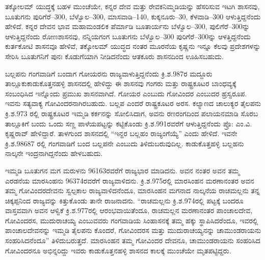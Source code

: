 ತಕ್ಕೋಲಮ್ ಯುದ್ಧಕ್ಕೆ ಬಹಳ ಮುಂಚೆಯೇ, ಕನ್ನರ ದೇವ ಮತ್ತು ರೇವಕನಿಮ್ಮಡಿಯನ್ನು ಹೆಸರಿಸುವ ಇಟಗಿ ಶಾಸನವು, ಬೂತುಗನು ಪುರಿಗೆರೆ–300, ಬೆಳ್ವೊಲ–300, ಮಾಸವಾಡಿ–140, ಕುಕ್ಕನೂರು–30, ಕೆಳವಾಡಿ–300 ಆಳುತ್ತಿದ್ದನೆಂದು ಹೇಳಿದೆ. ಕನ್ನರ ದೇವನ ಭಾವ ಮಹಾಮಂಡಲಿಕ ಪೆರ್ಮಾಡಿ ಬೂತಾರ್ಯನು ಬೆಳ್ವೊಲ–300, ಪುಲಿಗೆರೆ–300ನ್ನು ಆಳುತ್ತಿದ್ದನೆಂದು ರೋಣಶಾಸನವು, ನನ್ನಿಯಗಂಗ ಬೂತುಗನು ಬೆಳ್ವೊಲ–300 ಪುರಿಗೆರೆ–300ನ್ನು ಆಳತ್ತಿದ್ದನೆಂದು ಕುರ್ತಕೋಟಿ ಶಾಸನವೂ ಹೇಳಿವೆ, ತಕ್ಕೋಲಮ್ ಯುದ್ಧದ ನಂತರ ಮೂರನೆಯ ಕೃಷ್ಣನು ಇನ್ನೂ ಕೆಲವು ಪ್ರದೇಶಗಳನ್ನು ಸೇರಿಸಿ ಬೂತುಗನಿಗೆ ಪುನಃ ಕೊಡುಗೆಯಾಗಿ ನೀಡಿದನೆಂದು ಆತಕೂರು ಶಾಸನದಿಂದ ಊಹಿಸಬಹುದು.

ಬಲ್ಲಪನು ಗಂಗವಾಡಿಗೆ ಬಂದಾಗ ಗೋಯರನು ರಾಜ್ಯವಾಳುತ್ತಿದ್ದನೆಂದು ಕ್ರಿ.ಶ.987ರ ಮದ್ದೂರು ತಾಲ್ಲೂಕು\break ಕಾಡುಕೊತ್ತನಹಳ್ಳಿ ಶಾಸನದಲ್ಲಿ ಹೇಳಿದ್ದು ಈ ಶಾಸನವು ಗಂಗರು ಮತ್ತು ರಾಷ್ಟ್ರಕೂಟರ ಬಾಂಧವ್ಯಕ್ಕೆ ಸಂಬಂಧಿಸಿದ ಇನ್ನೊಂದು ಪ್ರಮುಖ ಶಾಸನವಾಗಿದೆ. ಗೋಯರ ಎಂಬುದು ಗೋವಿಂದರ ಎಂಬುದರ ಹ್ರಸ್ವರೂಪ. ಇವನು ಸತ್ಯವಾಕ್ಯ ಗೋವಿಂದರನಾಗಿರಬಹುದು. ಬಲ್ಲಪ ಎಂದರೆ ರಾಷ್ಟ್ರಕೂಟರ ಅರಸ. ಕಲ್ಯಾಣದ ಚಾಲುಕ್ಯರ ತೈಲಪನು ಕ್ರಿ.ಶ.973 ರಲ್ಲಿ ರಾಷ್ಟ್ರಕೂಟರ ಇಮ್ಮಡಿ ಕರ್ಕನನ್ನು ಸೋಲಿಸಿದಾಗ, ಅವನು ರಣರಂಗದಿಂದ ಪಲಾಯನಮಾಡಿ ಸೊರಬ ತಾಲ್ಲೂಕಿಗೆ ಬಂದು ಒಂದು ಸಣ್ಣ ಪಾಳೆಯಪಟ್ಟನ್ನು ಕಟ್ಟಿಕೊಂಡು ಕ್ರಿ.ಶ.991ರವರೆಗೆ ಆಳುತ್ತಿದ್ದನೆಂದು ಪ್ರೊ: ಎಂ.ವಿ. ಕೃಷ್ಣರಾವ್​ ಹೇಳಿದ್ದಾರೆ. ತಾಳಗುಂದ ಶಾಸನದಲ್ಲಿ “ಇನ್ದರ ಬಲ್ಲಹಂ ರಾಜ್ಯಂಗೆಯ್ಯೆ” ಎಂದು ಹೇಳಿದೆ. ಇವನೇ ಕ್ರಿ.ಶ.98687 ರಲ್ಲಿ ಗಂಗವಾಡಿಗೆ ಬಂದ ಬಲ್ಲಪನೇ ಎಂಬುದು ತಿಳಿದುಬರುವುದಿಲ್ಲ. ಕಾಡುಕೊತ್ತಹಳ್ಳಿ ಬಲ್ಲಹನು ನಾಲ್ಕನೇ ಇಂದ್ರನಾಗಿದ್ದನೆಂದು ಹೇಳಬಹುದು. 

ಇಮ್ಮಡಿ ಬೂತುಗನ ಮಗ ಮರುಳನು 96163ರವರೆಗೆ ರಾಜ್ಯಭಾರ ಮಾಡಿದನು. ಅವನ ನಂತರ ಅವನ ತಮ್ಮ ಎರಡನೆಯ ಮಾರಸಿಂಹನು 96374ರವರೆಗೆ ರಾಜ್ಯವಾಳಿದನು. ಕ್ರಿ.ಶ.975ರಲ್ಲಿ ಮಾರಸಿಂಹನ ಮರಣಾನಂತರ ಅವನ ತಮ್ಮ ಗೋವಿಂದರದೇವನು ಸ್ವಲ್ಪಕಾಲ ರಾಜ್ಯವಾಳಿದನೆಂದೂ, ಮಾರಸಿಂಹನ ಮಗನಾದ ನಾಲ್ಕನೆಯ ರಾಚಮಲ್ಲನು ತನ್ನ ಚಿಕ್ಕಪ್ಪನಿಂದ ರಾಜ್ಯವನ್ನು ಕಿತ್ತುಕೊಂಡು ತಾನೇ ರಾಜನಾದನು. “ರಾಚಮಲ್ಲನು ಕ್ರಿ.ಶ.974ರಲ್ಲಿ ಪಟ್ಟಕ್ಕೆ ಬಂದರೂ ವಾಸ್ತವವಾಗಿ ಅವನ ಆಳ್ವಿಕೆ ಕ್ರಿ.ಶ.977ರಲ್ಲಿ ಆರಂಭವಾಯಿತೆಂದೂ, ರಾಚಮಲ್ಲನ ಮರಣಾನಂತರ ಪಾಂಚಾಲದೇವ, ಗೋವಿಂದರಸ, ಮುದುರಾಚಯ್ಯ ಎಂಬುವವರು ಗಂಗವಾಡಿಯ ಸಿಂಹಾಸನಕ್ಕೆ ತಮ್ಮ ಹಕ್ಕು ಸ್ಥಾಪಿಸಿದರೆಂದೂ, ಇವರಲ್ಲಿ ಪಾಂಚಾಲದೇವನನ್ನು ಇಮ್ಮಡಿ ತೈಲಪನು ಕೊಂದರೆ, ಗೋವಿಂದರಸ ಮತ್ತು ಮುದುರಾಚಯ್ಯನನ್ನು ಚಾಮುಂಡರಾಯನು ಸಂಹರಿಸಿದನೆಂದೂ” ತಿಳಿದುಬರುತ್ತದೆ. ಮಾರಸಿಂಹನ ತಮ್ಮ ಗೋವಿಂದರ ದೇವನೂ, ಚಾಮುಂಡರಾಯನು ಸಂಹರಿಸಿದ ಗೋವಿಂದರನೂ ಅಭಿನ್ನರಿದ್ದು ಇವರು ಕಾಡುಕೊತ್ತನಹಳ್ಳಿ ಶಾಸನದ ಕಾಲಕ್ಕೆ ಮುಂಚೆಯೇ ಮೃತಪಟ್ಟಿದ್ದರು.


